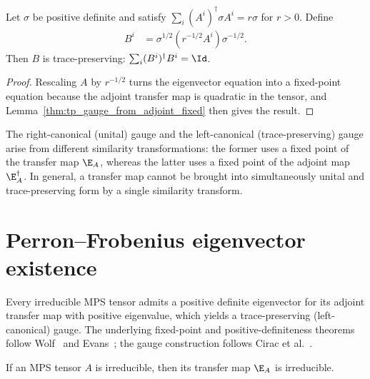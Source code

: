 \begin{lemma}%
    \label{thm:tp_gauge_from_adjoint_eigenvector}
    \leanok
    Let $\sigma$ be positive definite and satisfy
    $\sum_i (A^i)^\dagger \sigma A^i = r\sigma$ for $r>0$.
    Define
    \begin{align}
        B^i
         & = \sigma^{1/2}(r^{-1/2}A^i)\sigma^{-1/2}.
        \label{eq:qpf_tp_gauge_eigenvector}
    \end{align}
    Then $B$ is trace-preserving:
    $\sum_i (B^i)^\dagger B^i = \Id$.
\end{lemma}

\begin{proof}\leanok
    Rescaling $A$ by $r^{-1/2}$ turns the eigenvector equation into a
    fixed-point equation because the adjoint transfer map is quadratic in
    the tensor, and Lemma~\ref{thm:tp_gauge_from_adjoint_fixed} then gives
    the result.
\end{proof}


\begin{remark}\leanok
    The right-canonical (unital) gauge and the left-canonical (trace-preserving)
    gauge arise from different similarity transformations: the former uses a fixed
    point of the transfer map $\E_A$, whereas the latter uses a fixed point of the
    adjoint map $\E_A^\dagger$. In general, a transfer map cannot be brought into
    simultaneously unital and trace-preserving form by a single similarity transform.
\end{remark}


\section{Perron--Frobenius eigenvector existence}%
\label{sec:pf_eigenvector}

Every irreducible MPS tensor admits a positive definite eigenvector for its
adjoint transfer map with positive eigenvalue, which yields a trace-preserving
(left-canonical) gauge. The underlying fixed-point and positive-definiteness
theorems follow Wolf~\cite[Theorems~6.3 and 6.5]{Wolf2012Quantum} and
Evans~\cite{Evans1978Spectral}; the gauge construction follows
Cirac et al.~\cite[Appendix~A]{Cirac2016MPDO_arXiv}.


\begin{lemma}%
    \label{thm:transfer_map_irreducible_of_tensor}
    \leanok
    If an MPS tensor $A$ is irreducible, then its transfer map $\E_A$ is
    irreducible.
\end{lemma}

